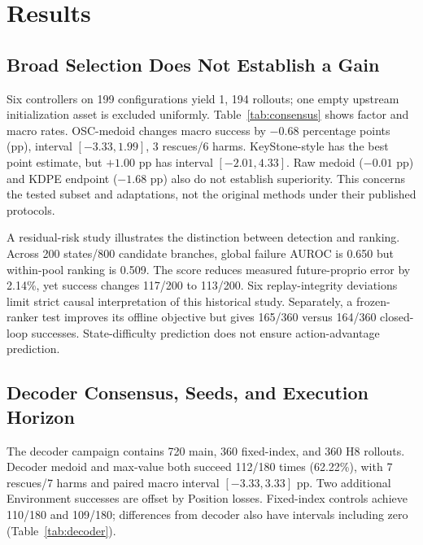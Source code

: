 \documentclass{article}
\begin{document}
\section{Results}
\subsection{Broad Selection Does Not Establish a Gain}
Six controllers on 199 configurations yield 1, 194 rollouts; one empty upstream
initialization asset is excluded uniformly. Table~\ref{tab:consensus} shows
factor and macro rates. OSC-medoid changes macro success by $-0.68$
percentage points (pp), interval $[-3.33,1.99]$, 3 rescues/6 harms.
KeyStone-style has the best point estimate, but $+1.00$ pp has interval
$[-2.01,4.33]$. Raw medoid ($-0.01$ pp) and KDPE endpoint ($-1.68$ pp) also
do not establish superiority. This concerns the tested subset and adaptations,
not the original methods under their published protocols.

\begin{table}[t]
\caption{Broad deployed comparison. Factor and macro columns are percentages;
the last column is successes out of 199. K1 is the single-sample control.}
\label{tab:consensus}
\centering\small
\end{table}

A residual-risk study illustrates the distinction between detection and
ranking. Across 200 states/800 candidate branches, global failure AUROC is 0.650
but within-pool ranking is 0.509. The score reduces measured future-proprio
error by 2.14\%, yet success changes 117/200 to 113/200.
Six replay-integrity deviations limit strict causal interpretation of this
historical study. Separately, a frozen-ranker test improves its offline
objective but gives 165/360 versus 164/360 closed-loop successes.
State-difficulty prediction does not ensure action-advantage prediction.

\subsection{Decoder Consensus, Seeds, and Execution Horizon}
The decoder campaign contains 720 main, 360 fixed-index, and 360 H8 rollouts.
Decoder medoid and max-value both succeed 112/180 times (62.22\%),
with 7 rescues/7 harms and paired macro interval $[-3.33,3.33]$ pp.
Two additional Environment successes are offset by Position losses.
Fixed-index controls achieve 110/180 and 109/180; differences from decoder
also have intervals including zero (Table~\ref{tab:decoder}).
\end{document}
